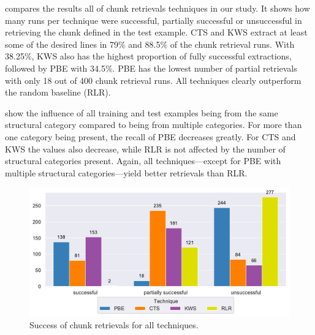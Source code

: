  compares the results all of chunk
retrievals techniques in our study.
It shows how many runs per technique were successful, partially
successful or unsuccessful in retrieving the chunk defined in the
test example.
CTS and KWS
extract at least some of the desired lines in 79\% and 88.5\%
of the chunk retrieval runs.
With 38.25\%, KWS also has the highest proportion of fully
successful extractions, followed by PBE with 34.5\%.
PBE has the
lowest number of partial retrievals with only 18 out of 400 chunk
retrieval runs.
All techniques clearly outperform the random baseline (RLR).

show the influence of all training and test examples being from the
same structural category compared to being from multiple categories.
For more
than one category being present, the recall of PBE decreases greatly.
For CTS and KWS the values also decrease, while RLR is not affected by
the number of structural categories present.
Again, all techniques---except for PBE with multiple structural
categories---yield better retrievals than RLR.

\begin{figure}[!t]
		\centering
		\includegraphics[width=\columnwidth,
		clip]{img/big-study/success-partial-all.pdf}
		\caption{Success of chunk retrievals for all techniques.}
		\label{fig:success-partial-all}
\end{figure}

